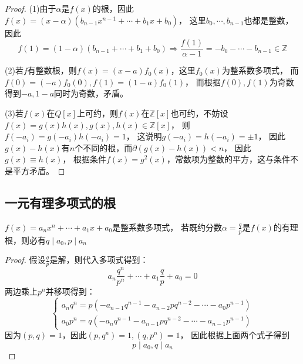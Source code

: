 \begin{proof}
  (1)由于$\alpha$是$f(x)$的根，因此$f(x) = (x - \alpha)(b_{n-1}x^{n-1} + \cdots + b_1x + b_0)$，
  这里$b_0,\cdots,b_{n-1}$也都是整数，因此
  \begin{equation*}
    f(1) = (1 - \alpha)(b_{n-1} + \cdots + b_1 + b_0) \Rightarrow \frac{f(1)}{\alpha - 1} = -b_0 - \cdots - b_{n-1} \in \mathbb{Z}
  \end{equation*}
  
  (2)若$f$有整数根，则$f(x) = (x - a)f_0(x)$，这里$f_0(x)$为整系数多项式，
  而$f(0) = (-a)f_0(0), f(1) = (1 - a)f_0(1)$，
  而根据$f(0),f(1)$为奇数得到$-a,1-a$同时为奇数，矛盾。

  (3)若$f(x)$在$Q[x]$上可约，则$f(x)$在$\mathbb{Z}[x]$也可约，不妨设$f(x) = g(x)h(x), g(x),h(x) \in \mathbb{Z}[x]$，
  则$f(-a_i) = g(-a_i)h(-a_i) = 1$，
  这说明$g(-a_i) = h(-a_i) = \pm 1$，
  因此$g(x) - h(x)$有$n$个不同的根，而$\partial(g(x) - h(x)) < n$，
  因此$g(x) \equiv h(x)$，
  根据条件$f(x) = g^2(x)$，常数项为整数的平方，这与条件不是平方矛盾。
\end{proof}


\subsection{一元有理多项式的根}

\begin{theorem}[有理多项式的根]
  $f(x) = a_nx^n + \cdots + a_1x + a_0$是整系数多项式，
  若既约分数$\alpha = \frac{q}{p}$是$f(x)$的有理根，则必有$q \mid a_0, p \mid a_n$
\end{theorem}

\begin{proof}
  假设$\frac{q}{p}$是解，则代入多项式得到：
  \begin{equation*}
    a_n \frac{q^n}{p^n} + \cdots + a_1 \frac{q}{p} + a_0 = 0
  \end{equation*}
  两边乘上$p^n$并移项得到：
  \begin{equation*}
    \begin{cases}
      a_n q^n = p(-a_{n-1} q^{n-1} - a_{n-2}pq^{n-2}- \cdots - a_0 p^{n-1})\\
      a_0 p^n = q(-a_n q^{n-1} - a_{n-1}pq^{n-2} - \cdots - a_{n-1}p^{n-1})
    \end{cases}
  \end{equation*}
  因为$(p,q) = 1$，因此$(p,q^n) = 1, (q,p^n) = 1$，
  因此根据上面两个式子得到
  \begin{equation*}
    p \mid a_0, q \mid a_n
  \end{equation*}
\end{proof}

